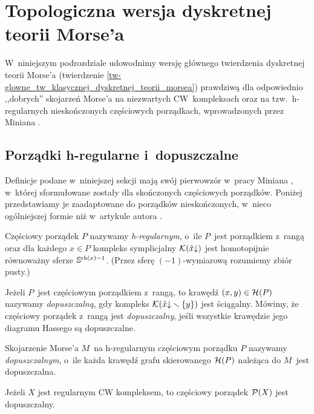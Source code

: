 
\section{Topologiczna wersja dyskretnej teorii Morse'a}\label{homotopical}
W~niniejszym podrozdziale udowodnimy wersję głównego twierdzenia dyskretnej teorii Morse'a (twierdzenie \ref{tw-glowne_tw_klasycznej_dyskretnej_teorii_morsea}) prawdziwą dla odpowiednio ,,dobrych'' skojarzeń Morse'a na niezwartych \mbox{CW kompleksach} oraz na tzw.~\mbox{h-regularnych} nieskończonych częściowych porządkach, wprowadzonych przez Miniana \cite{Minian12}.

\subsection{Porządki h-regularne i~dopuszczalne}
Definicje podane w~niniejszej sekcji mają swój pierwowzór w~pracy Miniana \cite{Minian12}, w~której sformułowane zostały dla skończonych częściowych porządków. Poniżej przedstawiamy je zaadaptowane do porządków nieskończonych, w~nieco ogólniejszej formie niż w~artykule autora \cite{Kukiela13}.

Częściowy porządek $P$ nazywamy \textit{h-regularnym}, o~ile $P$~jest porządkiem z~rangą oraz dla każdego $x\in P$ kompleks symplicjalny $\mathcal{K}(\hat{x}\mathord{\downarrow})$ jest homotopijnie równoważny sferze $\mathbb{S}^{\operatorname{rk}(x)-1}$. (Przez sferę $(-1)$-wymiarową rozumiemy zbiór pusty.)

Jeżeli $P$~jest częściowym porządkiem z~rangą, to krawędź $(x,y)\in\mathcal{H}(P)$  nazywamy \textit{dopuszczalną}, gdy kompleks $\mathcal{K}(\hat{x}\mathord{\downarrow}\smallsetminus\{y\})$ jest ściągalny. Mówimy, że częściowy porządek z~rangą jest \textit{dopuszczalny}, jeśli wszystkie krawędzie jego diagramu Hassego są dopuszczalne.

Skojarzenie Morse'a $M$~na h-regularnym częściowym porządku $P$ nazywamy \textit{dopuszczalnym}, o~ile każda krawędź grafu skierowanego $\mathcal{H}(P)$ należąca do $M$~jest dopuszczalna.

\begin{ex}\label{ex-regularny_kompleks_daje_dopuszczalny_porzadek}
Jeżeli $X$ jest regularnym CW kompleksem, to częściowy porządek $\mathcal{P}(X)$ jest dopuszczalny.
\end{ex}

